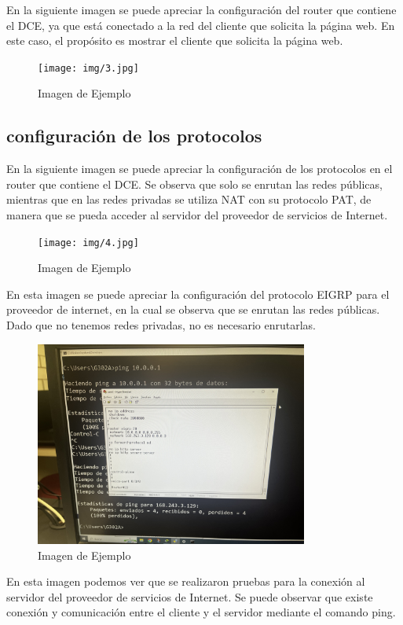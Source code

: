     En la siguiente imagen se puede apreciar la configuración del router que contiene el DCE, ya que está conectado a la red del cliente que solicita la página web. En este caso, el propósito es mostrar el cliente que solicita la página web.
    \begin{figure}[H]
        \centering
        \texttt{[image: img/3.jpg]}
        \caption{Imagen de Ejemplo}
        \label{fig:Router DCE Empresa 1}
    \end{figure}

    \subsection{configuración de los protocolos}
    En la siguiente imagen se puede apreciar la configuración de los protocolos en el router que contiene el DCE. Se observa que solo se enrutan las redes públicas, mientras que en las redes privadas se utiliza NAT con su protocolo PAT, de manera que se pueda acceder al servidor del proveedor de servicios de Internet.
    
    \begin{figure}[H]
        \centering
        \texttt{[image: img/4.jpg]}
        \caption{Imagen de Ejemplo}
        \label{fig:NAT empresa 1}
    \end{figure}

    En esta imagen se puede apreciar la configuración del protocolo EIGRP para el proveedor de internet, en la cual se observa que se enrutan las redes públicas. Dado que no tenemos redes privadas, no es necesario enrutarlas.
    \begin{figure}[H]
        \centering
        \includegraphics[width=0.8\textwidth]{img/6.jpg}
        \caption{Imagen de Ejemplo}
        \label{fig:EIGRP isp}
    \end{figure}
    En esta imagen podemos ver que se realizaron pruebas para la conexión al servidor del proveedor de servicios de Internet. Se puede observar que existe conexión y comunicación entre el cliente y el servidor mediante el comando ping.

